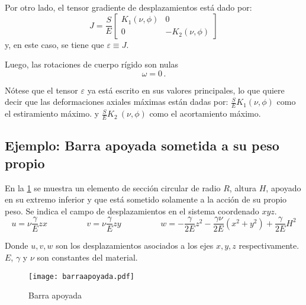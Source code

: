 \documentclass[../notas medios.tex]{subfiles}
\begin{document}
Por otro lado, el tensor gradiente de desplazamientos está dado por: 
\[J = \frac{S}{E}\left[ {\begin{array}{*{20}{c}}
{{K_1}\left( {\nu ,\phi } \right)}&0\\
0&{ - {K_2}\left( {\nu ,\phi } \right)}
\end{array}} \right]\]
y, en este caso, se tiene que \(\varepsilon  \equiv J\).

Luego, las rotaciones de cuerpo rígido son nulas
\[\omega  = 0\, .\]

Nótese que el tensor $\varepsilon $ ya está escrito en sus valores principales, lo que quiere decir que las deformaciones axiales máximas están dadas por: $\frac{S}{E}{K_1}\left( {\nu ,\phi }\right) $ como el estiramiento máximo. y $ \frac{S}{E} {K_2}\ \left({\nu ,\phi } \right)$  como el acortamiento máximo.

\subsection{Ejemplo: Barra apoyada sometida a su peso propio}

En la  \cref{BarApo} se muestra un elemento de sección circular de radio $R$, altura $H$, apoyado en su extremo inferior y que está sometido solamente a la acción de su propio peso. Se indica el campo de desplazamientos en el sistema coordenado $xyz$.
\begin{equation*}	
	u= \nu \dfrac{\gamma}{E} z x 
	\hspace{2cm}
	v= \nu \dfrac{\gamma}{E} z y 
	\hspace{2cm}
	w= -\dfrac{\gamma}{2E} z^2 - \dfrac{\gamma \nu}{2E} (x^2+y^2)+\dfrac{\gamma}{2E} H^2  
\end{equation*}

Donde 	$u,v,w$ son los desplazamientos asociados a los ejes $x,y,z$ respectivamente. $E$, $\gamma$ y $\nu$ son constantes del material. \\ 		\begin{figure}[h]
	\centering
	\texttt{[image: barraapoyada.pdf]}
	\caption{Barra apoyada}
	 \label{BarApo}
\end{figure}\\
\end{document}
